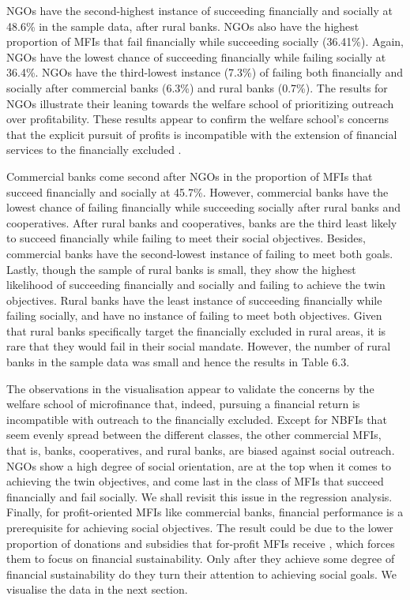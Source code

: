 \documentclass[a4paper, nobind]{templates/ociamthesis}
\begin{document}
NGOs have the second-highest instance of succeeding financially and socially at 48.6\% in the sample data, after rural banks. NGOs also have the highest proportion of MFIs that fail financially while succeeding socially (36.41\%). Again, NGOs have the lowest chance of succeeding financially while failing socially at 36.4\%. NGOs have the third-lowest instance (7.3\%) of failing both financially and socially after commercial banks (6.3\%) and rural banks (0.7\%). The results for NGOs illustrate their leaning towards the welfare school of prioritizing outreach over profitability. These results appear to confirm the welfare school's concerns that the explicit pursuit of profits is incompatible with the extension of financial services to the financially excluded \autocite{d2017ngos}.

Commercial banks come second after NGOs in the proportion of MFIs that succeed financially and socially at 45.7\%. However, commercial banks have the lowest chance of failing financially while succeeding socially after rural banks and cooperatives. After rural banks and cooperatives, banks are the third least likely to succeed financially while failing to meet their social objectives. Besides, commercial banks have the second-lowest instance of failing to meet both goals. Lastly, though the sample of rural banks is small, they show the highest likelihood of succeeding financially and socially and failing to achieve the twin objectives. Rural banks have the least instance of succeeding financially while failing socially, and have no instance of failing to meet both objectives. Given that rural banks specifically target the financially excluded in rural areas, it is rare that they would fail in their social mandate. However, the number of rural banks in the sample data was small and hence the results in Table 6.3.

The observations in the visualisation appear to validate the concerns by the welfare school of microfinance that, indeed, pursuing a financial return is incompatible with outreach to the financially excluded. Except for NBFIs that seem evenly spread between the different classes, the other commercial MFIs, that is, banks, cooperatives, and rural banks, are biased against social outreach. NGOs show a high degree of social orientation, are at the top when it comes to achieving the twin objectives, and come last in the class of MFIs that succeed financially and fail socially. We shall revisit this issue in the regression analysis. Finally, for profit-oriented MFIs like commercial banks, financial performance is a prerequisite for achieving social objectives. The result could be due to the lower proportion of donations and subsidies that for-profit MFIs receive \autocite{d2013unsubsidized}, which forces them to focus on financial sustainability. Only after they achieve some degree of financial sustainability do they turn their attention to achieving social goals. We visualise the data in the next section.
\end{document}
